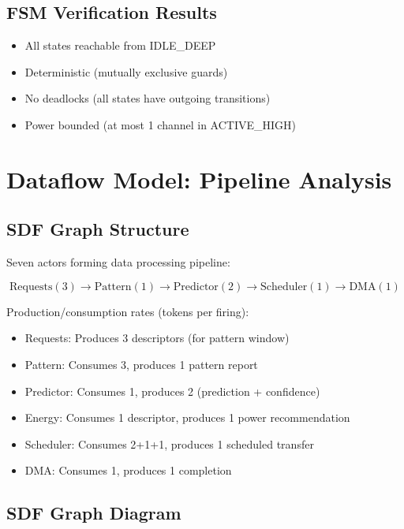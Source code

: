 \documentclass[conference]{IEEEtran}
\newcommand{\cmark}{\ding{51}}%
\begin{document}
\subsection{FSM Verification Results}
\begin{itemize}
    \item[\cmark] All states reachable from IDLE\_DEEP
    \item[\cmark] Deterministic (mutually exclusive guards)
    \item[\cmark] No deadlocks (all states have outgoing transitions)
    \item[\cmark] Power bounded (at most 1 channel in ACTIVE\_HIGH)
\end{itemize}

\section{Dataflow Model: Pipeline Analysis}

\subsection{SDF Graph Structure}
Seven actors forming data processing pipeline:

\begin{equation}
\text{Requests}(3) \rightarrow \text{Pattern}(1) \rightarrow \text{Predictor}(2) \rightarrow \text{Scheduler}(1) \rightarrow \text{DMA}(1)
\end{equation}

Production/consumption rates (tokens per firing):
\begin{itemize}
    \item Requests: Produces 3 descriptors (for pattern window)
    \item Pattern: Consumes 3, produces 1 pattern report
    \item Predictor: Consumes 1, produces 2 (prediction + confidence)
    \item Energy: Consumes 1 descriptor, produces 1 power recommendation
    \item Scheduler: Consumes 2+1+1, produces 1 scheduled transfer
    \item DMA: Consumes 1, produces 1 completion
\end{itemize}

\subsection{SDF Graph Diagram}
\end{document}
